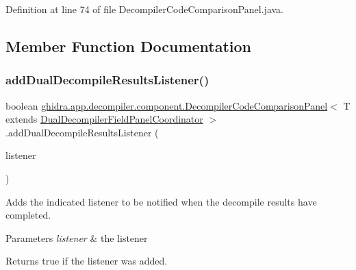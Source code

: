 Definition at line 74 of file Decompiler\+Code\+Comparison\+Panel.\+java.



\subsection{Member Function Documentation}
\mbox{\label{classghidra_1_1app_1_1decompiler_1_1component_1_1_decompiler_code_comparison_panel_a70db6533642ac366041e559f7d056976}} 
\subsubsection{\texorpdfstring{addDualDecompileResultsListener()}{addDualDecompileResultsListener()}}
{\footnotesize\ttfamily boolean \mbox{\hyperlink{classghidra_1_1app_1_1decompiler_1_1component_1_1_decompiler_code_comparison_panel}{ghidra.\+app.\+decompiler.\+component.\+Decompiler\+Code\+Comparison\+Panel}}$<$ T extends \mbox{\hyperlink{classghidra_1_1app_1_1decompiler_1_1component_1_1_dual_decompiler_field_panel_coordinator}{Dual\+Decompiler\+Field\+Panel\+Coordinator}} $>$.add\+Dual\+Decompile\+Results\+Listener (\begin{DoxyParamCaption}\item[{\mbox{\hyperlink{interfaceghidra_1_1app_1_1decompiler_1_1component_1_1_dual_decompile_results_listener}{Dual\+Decompile\+Results\+Listener}}}]{listener }\end{DoxyParamCaption})\hspace{0.3cm}{\ttfamily [inline]}}

Adds the indicated listener to be notified when the decompile results have completed. 
\begin{DoxyParams}{Parameters}
{\em listener} & the listener \\
\hline
\end{DoxyParams}
\begin{DoxyReturn}{Returns}
true if the listener was added. 
\end{DoxyReturn}



